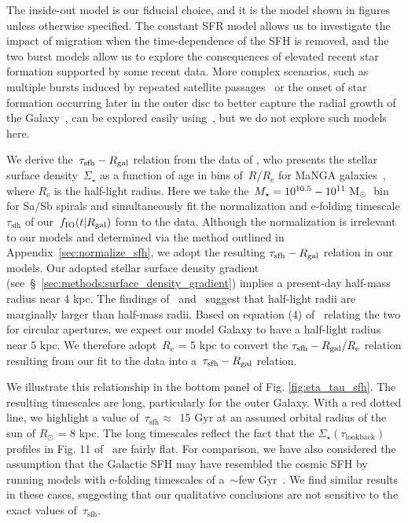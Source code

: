 \documentclass[draft2.tex]{subfiles}
\begin{document}
The inside-out model is our fiducial choice, and it is the model shown in 
figures unless otherwise specified. 
The constant SFR model allows us to investigate the impact of migration when 
the time-dependence of the SFH is removed, and the two burst models allow us to 
explore the consequences of elevated recent star formation supported by some 
recent data. 
{\color{red} 
More complex scenarios, such as multiple bursts induced by repeated satellite 
passages~\citep[e.g.][]{Lian2020a, Lian2020b, RuizLara2020, Sysoliatina2021} or 
the onset of star formation occurring later in the outer disc to better capture 
the radial growth of the Galaxy~\citep[e.g.][]{Bird2012, Bird2013}, can be 
explored easily using~\vice, but we do not explore such models here. 
} 
\par 
We derive the~$\tau_\text{sfh}-R_\text{gal}$ relation from the data of 
\citet{Sanchez2020}, who presents the stellar surface density~$\Sigma_\star$ as 
a function of age in bins of~$R/R_\text{e}$ for MaNGA 
galaxies~\citep{Bundy2015}, where $R_\text{e}$ is the half-light radius. 
Here we take the~$M_\star = 10^{10.5} - 10^{11}~\text{M}_\odot$~bin for Sa/Sb spirals 
and simultaneously fit the normalization and e-folding timescale 
$\tau_\text{sfh}$ of our~$f_\text{IO}(t|R_\text{gal})$ form to the data. 
Although the normalization is irrelevant to our models and determined via the 
method outlined in Appendix~\ref{sec:normalize_sfh}, we adopt the resulting 
$\tau_\text{sfh}-R_\text{gal}$ relation in our models. 
Our adopted stellar surface density gradient 
(see~\S~\ref{sec:methods:surface_density_gradient}) implies a present-day 
half-mass radius near 4 kpc. 
The findings of~\citet{Garcia-Benito2017} and~\citet{GonzalezDelgado2014} 
suggest that half-light radii are marginally larger than half-mass radii. 
Based on equation (4) of~\citet{GonzalezDelgado2014} relating the two for 
circular apertures, we expect our model Galaxy to have a 
half-light radius near 5 kpc. 
We therefore adopt~$R_\text{e}$ = 5 kpc to convert the 
$\tau_\text{sfh}-R_\text{gal}/R_\text{e}$ relation resulting from our fit to the 
\citet{Sanchez2020} data into a~$\tau_\text{sfh}-R_\text{gal}$ relation. 
\par 
We illustrate this relationship in the bottom panel of Fig. 
\ref{fig:eta_tau_sfh}. 
The resulting timescales are long, particularly for the outer Galaxy. 
With a red dotted line, we highlight a value of~$\tau_\text{sfh} \approx$~15 
Gyr at an assumed orbital radius of the sun of $R_\odot$ = 8 kpc. 
The long timescales reflect the fact that the 
$\Sigma_\star(\tau_\text{lookback})$ profiles in Fig. 11 of~\citet{Sanchez2020} 
are fairly flat. 
For comparison, we have also considered the assumption that the Galactic SFH 
may have resembled the cosmic SFH by running models with e-folding timescales 
of a~$\sim$few Gyr~\citep[e.g.][]{Madau2014}. 
We find similar results in these cases, suggesting that our qualitative 
conclusions are not sensitive to the exact values of~$\tau_\text{sfh}$. 
\end{document}
